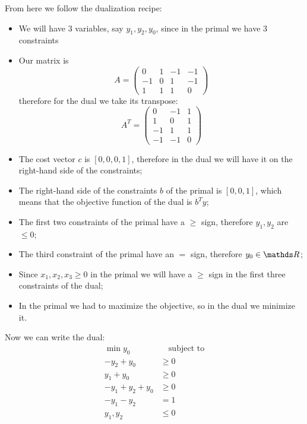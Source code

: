 \documentclass[12pt]{extarticle}
\numberwithin{equation}{section}
\begin{document}
From here we follow the dualization recipe:
\begin{itemize}
	\item We will have $3$ variables, say $y_1, y_2, y_0$, since in the primal we have 3 constraints
	\item Our matrix is
	      \begin{equation}
		      A = \begin{pmatrix}
			      0  & 1 & -1 & -1 \\
			      -1 & 0 & 1  & -1 \\
			      1  & 1 & 1  & 0
		      \end{pmatrix}
	      \end{equation}
	      therefore for the dual we take its transpose:
	      \begin{equation}
		      A^T = \begin{pmatrix}
			      0  & -1 & 1 \\
			      1  & 0  & 1 \\
			      -1 & 1  & 1 \\
			      -1 & -1 & 0
		      \end{pmatrix}
	      \end{equation}
	\item The cost vector $c$ is $[0,0,0,1]$, therefore in the dual we will have it on
	      the right-hand side of the constraints;
	\item The right-hand side of the constraints $b$ of the primal is $[0, 0, 1]$, which means
	      that the objective function of the dual is $b^T y$;
	\item The first two constraints of the primal have a $\geq$ sign,
	      therefore $y_1, y_2$ are $\leq 0$;
	\item The third constraint of the primal have an $=$ sign, therefore $y_0 \in \R$;
	\item Since $x_1, x_2, x_3 \geq 0$ in the primal we will have a $\geq$ sign
	      in the first three constraints of the dual;
	\item In the primal we had to maximize the objective, so in the dual we minimize it.
\end{itemize}

Now we can write the dual:
\begin{align}
	\min y_0          & \quad \text{subject to} \\
	-y_2 + y_0        & \geq 0                  \\
	y_1 + y_0         & \geq 0                  \\
	- y_1 + y_2 + y_0 & \geq 0                  \\
	-y_1 - y_2        & = 1                     \\
	y_1, y_2          & \leq 0
\end{align}
\end{document}
